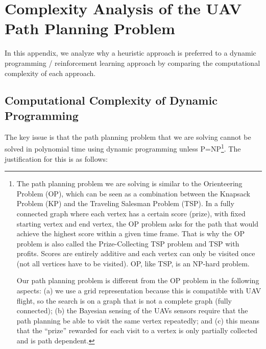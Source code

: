 \chapter{Complexity Analysis of the UAV Path Planning Problem}
\label{chap:complexity}

In this appendix, we analyze why a heuristic approach is preferred to a dynamic programming / reinforcement learning approach by comparing the computational complexity of each approach.

\section{Computational Complexity of Dynamic Programming}
\label{DPComplexity}

The key issue is that the path planning problem that we are solving cannot be solved in polynomial time using dynamic programming unless P=NP\footnote{The path planning problem we are solving is similar to the Orienteering Problem (OP), which can be seen as a combination between the Knapsack Problem (KP) and the Traveling Salesman Problem (TSP). In a fully connected graph where each vertex has a certain score (prize), with fixed starting vertex and end vertex, the OP problem asks for the path that would achieve the highest score within a given time frame. That is why the OP problem is also called the Prize-Collecting TSP problem and TSP with profits. Scores are entirely additive and each vertex can only be visited once (not all vertices have to be visited). OP, like TSP, is an NP-hard problem.

Our path planning problem is different from the OP problem in the following aspects: (a) we use a grid representation because this is compatible with UAV flight, so the search is on a graph that is not a complete graph (fully connected); (b) the Bayesian sensing of the UAVs sensors require that the path planning be able to visit the same vertex repeatedly; and (c) this means that the ``prize'' rewarded for each visit to a vertex is only partially collected and is path dependent.}. The justification for this is as follows:

